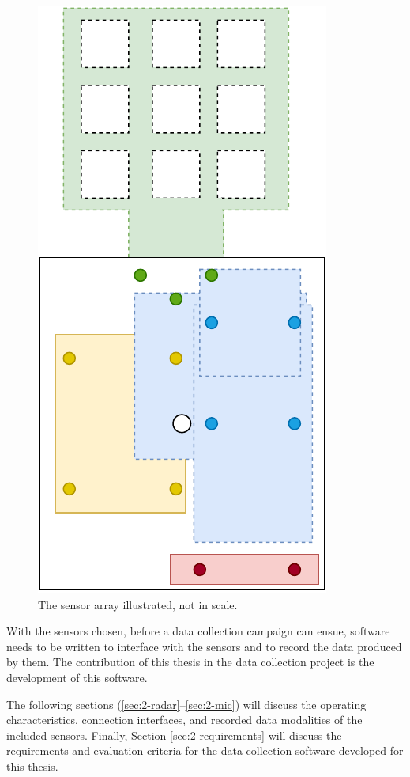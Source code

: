 \begin{figure}[H]
    \centering
    \includegraphics{fig/3/sensor-array.pdf}
    \caption{The sensor array illustrated, not in scale.}
    \label{fig:sensor-array}
\end{figure}

With the sensors chosen,
before a data collection campaign can ensue,
software needs to be written to interface with the sensors and to record the data produced by them.
The contribution of this thesis in the data collection project is the development of this software.

The following sections (\ref{sec:2-radar}--\ref{sec:2-mic}) will discuss the operating characteristics, connection interfaces,
and recorded data modalities of the included sensors.
Finally, Section \ref{sec:2-requirements} will discuss the requirements
and evaluation criteria for the data collection software developed for this thesis.


